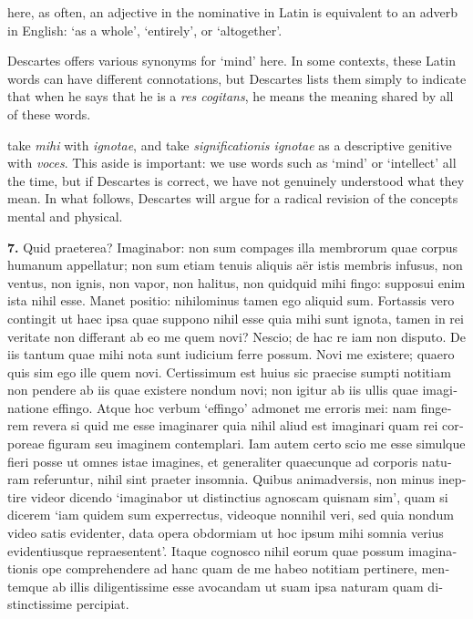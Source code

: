  here, as often, an adjective in the nominative in Latin is equivalent to an adverb in English: `as a whole', `entirely', or `altogether'.

 Descartes offers various synonyms for `mind' here. In some contexts, these Latin words can have different connotations, but Descartes lists them simply to indicate that when he says that he is a \textit{res cogitans}, he means the meaning shared by all of these words.

 take \textit{mihi} with \textit{ignotae}, and take \textit{significationis ignotae} as a descriptive genitive with \textit{voces}. This aside is important: we use words such as `mind' or `intellect' all the time, but if Descartes is correct, we have not genuinely understood what they mean. In what follows, Descartes will argue for a radical revision of the concepts mental and physical.

\clearpage

\beginnumbering
\pstart
\begin{latin}
    \textenglish{\textbf{7.}} Quid praeterea? Imaginabor: non sum compages illa membrorum quae corpus humanum appellatur; non sum etiam tenuis aliquis aër istis membris infusus, non ventus, non ignis, non vapor, non halitus, non quidquid mihi fingo: supposui enim ista nihil esse. Manet positio: nihilominus tamen ego aliquid sum. Fortassis vero contingit ut haec ipsa quae suppono nihil esse quia mihi sunt ignota, tamen in rei veritate non differant ab eo me quem novi? Nescio; de hac re iam non disputo. De iis tantum quae mihi nota sunt iudicium ferre possum. Novi me existere; quaero quis sim ego ille quem novi. Certissimum est huius sic praecise sumpti notitiam non pendere ab iis quae existere nondum novi; non igitur ab iis ullis quae imaginatione effingo. Atque hoc verbum `effingo' admonet me erroris mei: nam fingerem revera si quid me esse imaginarer quia nihil aliud est imaginari quam rei corporeae figuram seu imaginem contemplari. Iam autem certo scio me esse simulque fieri posse ut omnes istae imagines, et generaliter quaecunque ad corporis naturam referuntur, nihil sint praeter insomnia. Quibus animadversis, non minus ineptire videor dicendo `imaginabor ut distinctius agnoscam quisnam sim', quam si dicerem `iam quidem sum experrectus, videoque nonnihil veri, sed quia nondum video satis evidenter, data opera obdormiam ut hoc ipsum mihi somnia verius evidentiusque repraesentent'. Itaque cognosco nihil eorum quae possum imaginationis ope comprehendere ad hanc quam de me habeo notitiam pertinere, mentemque ab illis diligentissime esse avocandam ut suam ipsa naturam quam distinctissime percipiat.
\end{latin}
\pend
\endnumbering

